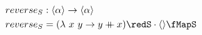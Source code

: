 \documentclass[preview]{standalone}
\begin{document}
\begin{align*}
  reverse_S &: \vect{\alpha} \rightarrow \vect{\alpha} \\
  reverse_S & = (\lambda\ x\ y \rightarrow y \fcat x) \redS \cdot \vect{} \fMapS
\end{align*}
\end{document}
